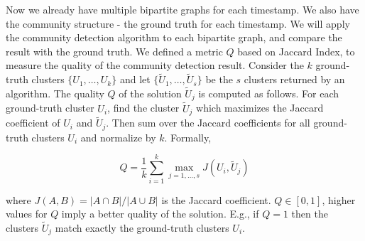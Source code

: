 Now we already have multiple bipartite graphs for each timestamp.
We also have the community structure - the ground truth for each timestamp.
We will apply the community detection algorithm to each bipartite graph,
and compare the result with the ground truth.
We defined a metric $Q$ based on Jaccard Index, to measure the quality of the community detection result.
Consider the $k$ ground-truth clusters $\{U_1, \ldots, U_k\}$
and let $\{\tilde{U}_1, \ldots, \tilde{U}_s\}$ be the $s$ clusters returned by an algorithm.
The quality $Q$ of the solution $\tilde{U}_j$ is computed as follows.
For each ground-truth cluster $U_i$, find the cluster $\tilde{U}_j$
which maximizes the Jaccard coefficient of $U_i$ and $\tilde{U}_j$.
Then sum over the Jaccard coefficients for all ground-truth clusters $U_i$ and normalize by $k$.
Formally,

\begin{equation}
	Q=\frac{1}{k} \sum_{i=1}^k \max _{j=1, \ldots, s} J\left(U_i, \tilde{U}_j\right)
\end{equation}

where $J(A, B)=|A \cap B| /|A \cup B|$ is the Jaccard coefficient.
$Q \in [0,1]$, higher values for $Q$ imply a better quality of the solution.
E.g., if $Q=1$ then the clusters $\tilde{U}_j$ match exactly the ground-truth clusters $U_i$.


